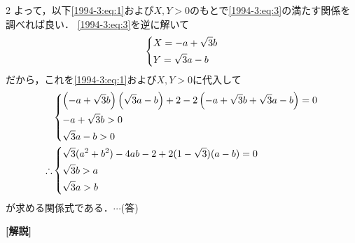 \documentclass[../../../../main.tex]{subfiles}
\begin{document}
\begin{multicols}{2}
  よって，以下\cref{1994-3:eq:1}および$X,Y>0$のもとで\cref{1994-3:eq:3}の満たす関係を調べれば良い．
  \cref{1994-3:eq:3}を逆に解いて
  \begin{align*}
    \begin{dcases}
      X = -a+\sqrt{3}b \\
      Y = \sqrt{3}a-b
    \end{dcases}
  \end{align*}
  だから，これを\cref{1994-3:eq:1}および$X,Y>0$に代入して
  \begin{align*}
     & \begin{dcases}
         \left(-a+\sqrt{3}b\right)\left(\sqrt{3}a-b\right) +2-2\left(-a+\sqrt{3}b+\sqrt{3}a-b\right)=0 \\
         -a+\sqrt{3}b > 0                                                                              \\
         \sqrt{3}a-b > 0
       \end{dcases} \\
    \therefore
     & \begin{dcases}
         \sqrt{3}(a^2+b^2)-4ab-2+2(1-\sqrt{3})(a-b) = 0 \\
         \sqrt{3}b > a                                  \\
         \sqrt{3}a > b
       \end{dcases}
  \end{align*}
  が求める関係式である．$\cdots$(答)

  \vspace{10pt}
  {\bf[解説]}


  \newpage
\end{multicols}
\end{document}
